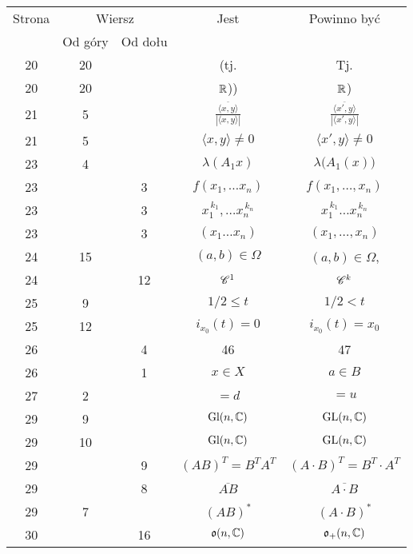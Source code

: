 \documentclass[a4paper,11pt]{article}
\begin{document}
\begin{center}
  \begin{tabular}{|c|c|c|c|c|}
    \hline
    Strona & \multicolumn{2}{c|}{Wiersz} & Jest
                              & Powinno być \\ \cline{2-3}
    & Od góry & Od dołu & & \\
    \hline
    20  & 20 & & (tj. & Tj. \\
    20  & 20 & & $\mathbb{R}$)) & $\mathbb{R}$) \\
    21  &  5 & & $\displaystyle
                 \frac{ \overline{ \langle x, y \rangle } }{ | \langle x, y \rangle | }$
    & $\displaystyle \frac{ \overline{ \langle x', y \rangle } }{ | \langle x', y \rangle | }$ \\
    21  &  5 & & $\langle x, y \rangle \neq 0$ & $\langle x', y \rangle \neq 0$ \\
    23  &  4 & & $\lambda ( A_{ 1 } x )$ & $\lambda \big( A_{ 1 }( x ) \big)$ \\
    23  & &  3 & $f( x_{ 1 }, \ldots x_{ n } )$ & $f( x_{ 1 }, \ldots, x_{ n } )$ \\
    23  & &  3 & $x_{ 1 }^{ \, k_{ 1 } }, \ldots x_{ n }^{ \, k_{ n } }$
           & $x_{ 1 }^{ \, k_{ 1 } } \ldots x_{ n }^{ \, k_{ n } }$ \\
    23  & &  3 & $( x_{ 1 } \ldots x_{ n } )$ & $( x_{ 1 }, \ldots, x_{ n } )$ \\
    24  & 15 & & $( a, b ) \in \Omega$ & $( a, b ) \in \Omega$, \\
    24  & & 12 & $\mathcal{C}^{ 1 }$ & $\mathcal{C}^{ k }$ \\
    25  &  9 & & $1 / 2 \leq t$ & $1 / 2 < t$ \\
    25  & 12 & & $i_{ x_{ 0 } }( t ) = 0$ & $i_{ x_{ 0 } }( t ) = x_{ 0 }$ \\
    26  & &  4 & 46 & 47 \\
    26  & &  1 & $x \in X$ & $a \in B$ \\
    27  &  2 & & $= d$ & $= u$ \\
    29  &  9 & & $\textrm{Gl}( n, \mathbb{C} )$ & $\mathrm{GL}( n, \mathbb{C} )$ \\
    29  & 10 & & $\textrm{Gl}( n, \mathbb{C} )$ & $\mathrm{GL}( n, \mathbb{C} )$ \\
    29  & &  9 & $( A B )^{ T } = B^{ T } A^{ T }$
           & $( A \cdot B )^{ T } = B^{ T } \cdot A^{ T }$ \\
    29  & &  8 & $\overline{ A B }$ & $\overline{ A \cdot B }$ \\
    29  &  7 & & $( A B )^{ * }$ & $( A \cdot B )^{ * }$ \\
    30  & & 16 & $\mathfrak{o}( n, \mathbb{C} )$ & $\mathfrak{o}_{ + }( n, \mathbb{C} )$ \\

\end{tabular}
\end{center}
\end{document}
